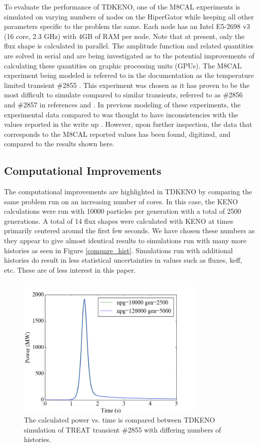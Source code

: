 \documentclass{anstrans}
\begin{document}
To evaluate the performance of TDKENO, one of the M8CAL experiments is simulated on varying numbers of nodes on the HiperGator while keeping all other parameters specific to the problem the same.  Each node has an Intel E5-2698 v3 (16 core, 2.3 GHz) with 4GB of RAM per node. Note that at present, only the flux shape is calculated in parallel.  The amplitude function and related quantities are solved in serial and are being investigated as to the potential improvements of calculating these quantities on graphic processing units (GPUs).  The M8CAL experiment being modeled is referred to in the documentation as the temperature limited transient \#2855 \cite{Robinson_Bauer_1994}.  This experiment was chosen as it has proven to be the most difficult to simulate compared to similar transients, referred to as \#2856 and \#2857 in references \cite{physor_mausolff} and \cite{kontogeorgakos2014treat}.  In previous modeling of these experiments, the experimental data compared to was thought to have inconsistencies with the values reported in the write up \cite{physor_mausolff}.  However, upon further inspection, the data that corresponds to the M8CAL reported values has been found, digitized, and compared to the results shown here.

\subsection{Computational Improvements}

The computational improvements are highlighted in TDKENO by comparing the same problem run on an increasing number of cores.  In this case, the KENO calculations were run with 10000 particles per generation with a total of 2500 generations. A total of 14 flux shapes were calculated with KENO at times primarily centered around the first few seconds.  We have chosen these numbers as they appear to give almost identical results to simulations run with many more histories as seen in Figure \ref{compare_hist}.  Simulations run with additional histories do result in less statistical uncertainties in values such as fluxes, keff, etc.  These are of less interest in this paper.  

\begin{figure}[h]
    \centering
    \includegraphics[width=9cm]{figures/comp_npg2855.png}
    \caption{The calculated power vs. time is compared between TDKENO simulation of TREAT transient \#2855 with differing numbers of histories. }
\end{figure}
\end{document}
